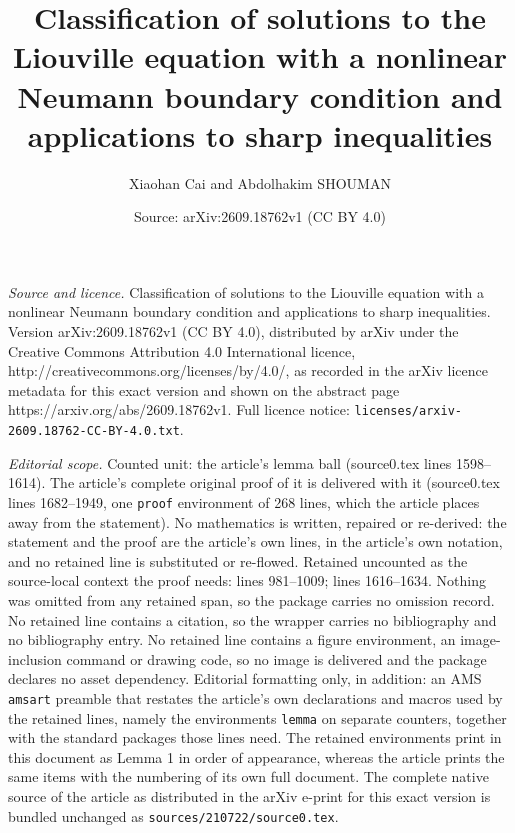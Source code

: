 \documentclass[10pt,a4paper]{amsart}
\title{Classification of solutions to the Liouville equation with a nonlinear Neumann boundary condition and applications to sharp inequalities}
\author{Xiaohan Cai and Abdolhakim SHOUMAN}
\date{Source: arXiv:2609.18762v1 (CC BY 4.0)}
\begin{document}
\maketitle

\noindent\emph{Source and licence.} Classification of solutions to the Liouville equation with a nonlinear Neumann boundary condition and applications to sharp inequalities. Version arXiv:2609.18762v1 (CC BY 4.0), distributed by arXiv under the Creative Commons Attribution 4.0 International licence, http://creativecommons.org/licenses/by/4.0/, as recorded in the arXiv licence metadata for this exact version and shown on the abstract page https://arxiv.org/abs/2609.18762v1. Full licence notice: \texttt{licenses/arxiv-2609.18762-CC-BY-4.0.txt}.\par\smallskip

\noindent\textit{Editorial scope.} Counted unit: the article's lemma ball (source0.tex lines 1598--1614). The article's complete original proof of it is delivered with it (source0.tex lines 1682--1949, one \texttt{proof} environment of 268 lines, which the article places away from the statement). No mathematics is written, repaired or re-derived: the statement and the proof are the article's own lines, in the article's own notation, and no retained line is substituted or re-flowed.  Retained uncounted as the source-local context the proof needs: lines 981--1009; lines 1616--1634.  Nothing was omitted from any retained span, so the package carries no omission record.  No retained line contains a citation, so the wrapper carries no bibliography and no bibliography entry.  No retained line contains a figure environment, an image-inclusion command or drawing code, so no image is delivered and the package declares no asset dependency.  Editorial formatting only, in addition: an AMS \texttt{amsart} preamble that restates the article's own declarations and macros used by the retained lines, namely the environments \texttt{lemma} on separate counters, together with the standard packages those lines need.  The retained environments print in this document as Lemma 1 in order of appearance, whereas the article prints the same items with the numbering of its own full document.  The complete native source of the article as distributed in the arXiv e-print for this exact version is bundled unchanged as \texttt{sources/210722/source0.tex}.
\end{document}
